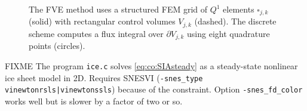 \documentclass[final,leqno,onefignum,onetabnum]{siamltex1213bueler}
\begin{document}
\begin{figure}[h]
\begin{center}

\end{center}
\caption{The FVE method uses a structured FEM grid of $Q^1$ elements $\square_{j,k}$ (solid) with rectangular control volumes $V_{j,k}$ (dashed).  The discrete scheme computes a flux integral over $\partial V_{j,k}$ using eight quadrature points (circles).}
\label{fig:co:mstarstencil}
\end{figure}

FIXME The program \texttt{ice.c} solves \eqref{eq:co:SIAsteady} as a steady-state nonlinear ice sheet model in 2D.  Requires SNESVI (\texttt{-snes\_type vinewtonrsls|vinewtonssls}) because of the constraint.  Option \texttt{-snes\_fd\_color} works well but is slower by a factor of two or so.






\end{document}
